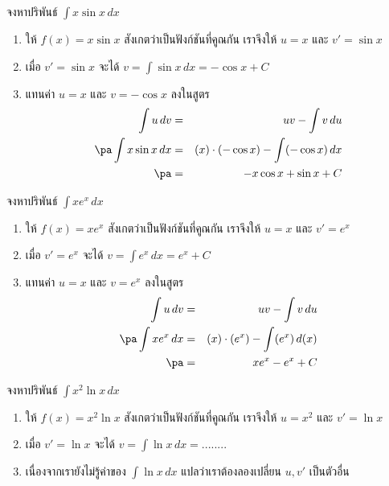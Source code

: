 \begin{frame}[t]
\begin{ex}
จงหาปริพันธ์ $\int x \sin x \, dx$
\end{ex} \pa
\begin{sol}
\begin{enumerate}
\item ให้ $f(x) = x \sin x$ \pa สังเกตว่าเป็นฟังก์ชันที่คูณกัน เราจึงให้ $u = x$ และ $v' = \sin x$ \pa
\item เมื่อ $v' = \sin x$ \pa จะได้ $v = \int \sin x \, dx = -\cos x + C$ \pa
\item แทนค่า $u = x$ และ $v = -\cos x$ ลงในสูตร \pa
\begin{eqnarray*}
\int u \, dv &=& uv - \int v\, du \\ \pa
\int x \sin x \, dx &=& (x) \cdot (-\cos x) - \int (-\cos x) \, dx \\ \pa
&=& -x\cos x + \sin x + C
\end{eqnarray*}
\end{enumerate}
\end{sol}
\end{frame}


\begin{frame}[t]
\begin{ex}
จงหาปริพันธ์ $\int x e^x \, dx$
\end{ex} \pa
\begin{sol}
\begin{enumerate}
\item ให้ $f(x) = x e^x$ \pa สังเกตว่าเป็นฟังก์ชันที่คูณกัน เราจึงให้ $u = x$ และ $v' = e^x$ \pa
\item เมื่อ $v' = e^x$ \pa จะได้ $v = \int e^x \, dx = e^x + C$ \pa
\item แทนค่า $u = x$ และ $v = e^x$ ลงในสูตร \pa
\begin{eqnarray*}
\int u \, dv &=& uv - \int v\, du \\ \pa
\int x e^x \, dx &=& (x) \cdot (e^x) - \int (e^x) \, d (x) \\ \pa
&=& xe^x - e^x + C
\end{eqnarray*}
\end{enumerate}
\end{sol}
\end{frame}


\begin{frame}[t]
\begin{ex}
จงหาปริพันธ์ $\int x^2 \ln x \, dx$
\end{ex}
\begin{sol}
\begin{enumerate}
\item ให้ $f(x) = x^2 \ln x$ \pa สังเกตว่าเป็นฟังก์ชันที่คูณกัน เราจึงให้ $u = x^2$ และ $v' = \ln x$ \pa
\item เมื่อ $v' = \ln x$ \pa จะได้ $v = \int \ln x \, dx = ........$ \pa
\item เนื่องจากเรายังไม่รู้ค่าของ $\int \ln x \, dx$ แปลว่าเราต้องลองเปลี่ยน $u, v'$ เป็นตัวอื่น \pa
\end{enumerate}
\end{sol}
\end{frame}


